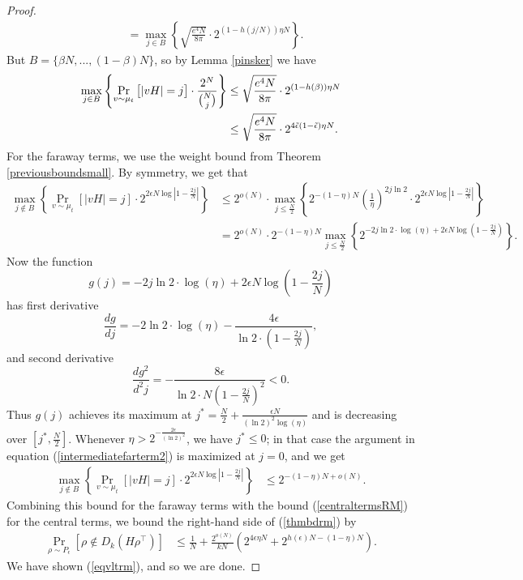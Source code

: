\documentclass[12pt]{article}
\begin{document}
\begin{proof}
\begin{align*}
    &= \max_{j\in B}\left\{\sqrt{\frac{e^4 N}{8\pi}}\cdot 2^{(1-h(j/N))\eta N}\right\}.
\end{align*}
But $B=\{\beta N,...,(1-\beta)N\}$, so by Lemma \ref{pinsker} we have
\begin{align}\label{centraltermsRM}
    \max_{j\in B}\left\{ \Pr_{v\sim\mu_t}\big[|vH|=j \big]\cdot \frac{2^N}{\binom{N}{j}}  \right\} &\leq \sqrt{\frac{e^4 N}{8\pi}}\cdot 2^{(1-h(\beta))\eta N}  \nonumber \\
    &\leq \sqrt{\frac{e^4 N}{8\pi}}\cdot 2^{4\Tilde{\epsilon}(1-\Tilde{\epsilon})\eta N}.
\end{align}
For the faraway terms, we use the weight bound from Theorem \ref{previousboundsmall}. By symmetry, we get that
\begin{align}\label{intermediatefarterm2}
\max_{ j\notin B} \left\{\Pr_{v\sim \mu_t}[|vH|=j]\cdot   2^{2\epsilon N\log|1-\frac{2j}{N}|} \right\}
&\leq 2^{o(N)}\cdot \max_{ j\leq\frac{N}{2}} \left\{  2^{-(1-\eta) N} \left(\frac{1}{\eta}\right)^{2j\ln2}  \cdot 2^{2\epsilon N\log|1-\frac{2j}{N}|} \right\}\nonumber\\
&=2^{o(N)}\cdot2^{-(1-\eta) N} \max_{ j\leq \frac{N}{2}} \left\{   2^{-2j\ln 2 \cdot\log(\eta)+2\epsilon N\log(1-\frac{2j}{N})} \right\}.
\end{align}
Now the function 
$$g(j)=-2j\ln 2\cdot \log(\eta)+2\epsilon N\log(1-\frac{2j}{N})$$
has first derivative
$$\frac{dg}{dj}=-2\ln 2\cdot \log(\eta)-\frac{4\epsilon}{\ln2\cdot (1-\frac{2j}{N})},$$
and second derivative
$$\frac{dg^2}{d^2j}=-\frac{8\epsilon}{\ln2\cdot N (1-\frac{2j}{N})^2}<0.$$
Thus $g(j)$ achieves its maximum at $j^*=\frac{N}{2}+\frac{\epsilon N}{(\ln2)^2\log(\eta)}$ and is decreasing over $[j^*,\frac{N}{2}]$. Whenever $\eta>2^{-\frac{2\epsilon}{(\ln2)^2}}$, we have $j^*\leq0$; in that case the argument in equation (\ref{intermediatefarterm2}) is maximized at $j=0$, and we get
\begin{align*}
\max_{ j\notin B} \left\{\Pr_{v\sim \mu_t}[|vH|=j]\cdot   2^{2\epsilon N\log|1-\frac{2j}{N}|} \right\}
&\leq 2^{-(1-\eta) N+o(N)}.
\end{align*}
Combining this bound for the faraway terms with the bound (\ref{centraltermsRM}) for the central terms, we bound the right-hand side of (\ref{thmbdrm}) by
\begin{align*}
\Pr_{\rho\sim P_\epsilon}[\rho\notin D_k(H\rho^\intercal)]
&\leq \frac{1}{N}+\frac{2^{o(N)}}{kN}\left(2^{4\epsilon\eta N}+
  2^{h(\epsilon)N-(1-\eta)N}\right).
\end{align*}
We have shown (\ref{eqvltrm}), and so we are done.
\end{proof}
\end{document}
